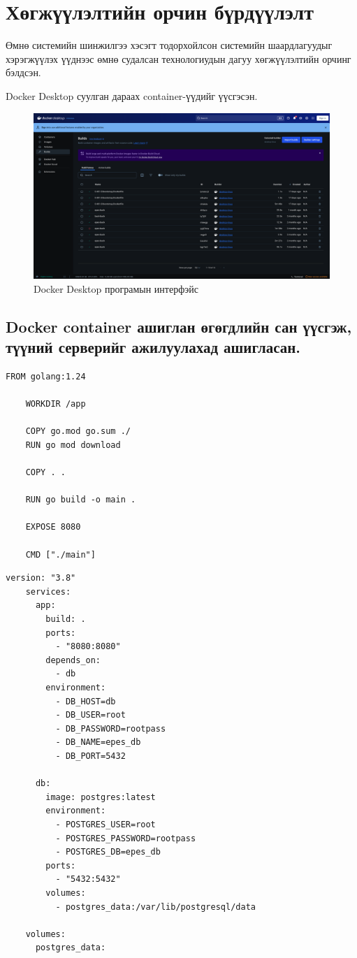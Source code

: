 \newpage
\section{Хөгжүүлэлтийн орчин бүрдүүлэлт}

Өмнө системийн шинжилгээ хэсэгт тодорхойлсон системийн шаардлагуудыг хэрэгжүүлэх
үүднээс өмнө судалсан технологиудын дагуу хөгжүүлэлтийн орчинг бэлдсэн.

Docker Desktop суулган дараах container-үүдийг үүсгэсэн.
\begin{figure}[H]
    \centering
    \includegraphics[scale=0.25]{src/images/uiux/dockerdash.png}
    \caption{Docker Desktop програмын интерфэйс}
    \label{fig:dockerdash}
\end{figure}

\subsection{Docker container ашиглан өгөгдлийн сан үүсгэж, түүний серверийг ажилуулахад ашигласан.}

\begin{lstlisting}[language=Docker, caption=Dockerfile, frame=single]
    FROM golang:1.24

    WORKDIR /app

    COPY go.mod go.sum ./
    RUN go mod download

    COPY . .

    RUN go build -o main .

    EXPOSE 8080

    CMD ["./main"]
\end{lstlisting}

\begin{lstlisting}[language=Docker, caption=docker-compose.yaml, frame=single]
    version: "3.8"
    services:
      app:
        build: .
        ports:
          - "8080:8080"
        depends_on:
          - db
        environment:
          - DB_HOST=db
          - DB_USER=root
          - DB_PASSWORD=rootpass
          - DB_NAME=epes_db
          - DB_PORT=5432
    
      db:
        image: postgres:latest
        environment:
          - POSTGRES_USER=root
          - POSTGRES_PASSWORD=rootpass
          - POSTGRES_DB=epes_db
        ports:
          - "5432:5432"
        volumes:
          - postgres_data:/var/lib/postgresql/data
    
    volumes:
      postgres_data:    
\end{lstlisting}

